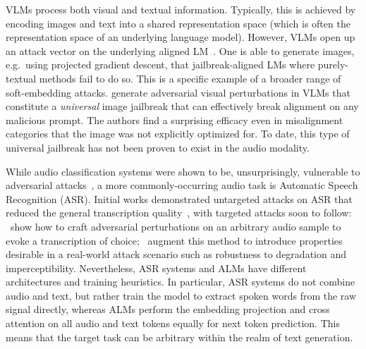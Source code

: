  VLMs process both visual and textual information. Typically, this is achieved by encoding images and text into a shared representation space (which is often the representation space of an underlying language model). However, VLMs open up an attack vector on the underlying aligned LM~\cite{carlini2024alignedneuralnetworksadversarially}. One is able to generate images, e.g.\ using projected gradient descent, that jailbreak-aligned LMs where purely-textual methods fail to do so. This is a specific example of a broader range of soft-embedding attacks. 
\citet{qi2023visualadversarialexamplesjailbreak} generate adversarial visual perturbations in VLMs that constitute a \textit{universal} image jailbreak that can effectively break alignment on any malicious prompt. The authors find a surprising efficacy even in misalignment categories that the image was not explicitly optimized for. To date, this type of universal jailbreak has not been proven to exist in the audio modality.

 While audio classification systems were shown to be, unsurprisingly, vulnerable to adversarial attacks~\cite{FlowMur}, a more commonly-occurring audio task is Automatic Speech Recognition (ASR). 
Initial works demonstrated untargeted attacks on ASR that reduced the general transcription quality~\citep{gonguntargetedasr, wuuntargetedasr}, with targeted attacks soon to follow: \citet{carlini2018audioadversarialexamplestargeted}~show how to craft adversarial perturbations on an arbitrary audio sample to evoke a transcription of choice; \citet{qin2019imperceptiblerobusttargetedasr}~augment this method to introduce properties desirable in a real-world attack scenario such as robustness to degradation and imperceptibility. 
Nevertheless, ASR systems and ALMs have different architectures and training heuristics. In particular, ASR systems do not combine audio and text, but rather train the model to extract spoken words from the raw signal directly, whereas ALMs perform the embedding projection and cross attention on all audio and text tokens equally for next token prediction. This means that the target task can be arbitrary within the realm of text generation.


